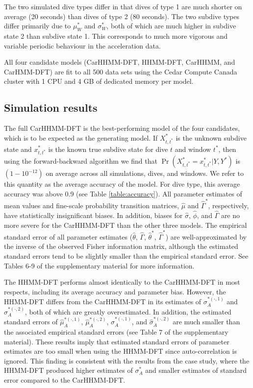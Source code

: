 The two simulated dive types differ in that dives of type 1 are much shorter on average (20 seconds) than dives of type 2 (80 seconds). The two subdive types differ primarily due to $\mu_W^*$ and $\sigma_W^*$, both of which are much higher in subdive state 2 than subdive state 1. This corresponds to much more vigorous and variable periodic behaviour in the acceleration data.

All four candidate models (CarHHMM-DFT, HHMM-DFT, CarHHMM, and CarHMM-DFT) are fit to all 500 data sets using the Cedar Compute Canada cluster with 1 CPU and 4 GB of dedicated memory per model.

\subsection{Simulation results}

The full CarHHMM-DFT is the best-performing model of the four candidates, which is to be expected as the generating model. If $X^*_{t,t^*}$ is the unknown subdive state and $x^*_{t,t^*}$ is the known true subdive state for dive $t$ and window $t^*$, then using the forward-backward algorithm we find that $\Pr(X^*_{t,t^*} = x^*_{t,t^*}|Y,Y^*)$ is $(1 - 10^{-12})$ on average across all simulations, dives, and windows. We refer to this quantity as the average accuracy of the model. For dive type, this average accuracy was above 0.9 (see Table \ref{table:accuracy}). All parameter estimates of mean values and fine-scale probability transition matrices, $\hat \mu$ and $\hat \Gamma^*$, respectively, have statistically insignificant biases. In addition, biases for $\hat \sigma$, $\hat \phi$, and $\hat \Gamma$ are no more severe for the CarHHMM-DFT than the other three models. The empirical standard error of all parameter estimates ($\hat \theta$, $\hat \Gamma$, $\hat \theta^*$, $\hat \Gamma^*$) are well-approximated by the inverse of the observed Fisher information matrix, although the estimated standard errors tend to be slightly smaller than the empirical standard error. See Tables 6-9 of the supplementary material for more information.

The HHMM-DFT performs almost identically to the CarHHMM-DFT in most respects, including its average accuracy and parameter bias. However, the HHMM-DFT differs from the CarHHMM-DFT in its estimates of $\sigma_A^{*(\cdot,1)}$ and $\sigma_A^{*(\cdot,2)}$, both of which are greatly overestimated. In addition, the estimated standard errors of $\hat \mu_A^{*(\cdot,1)}$, $\hat \mu_A^{*(\cdot,2)}$, $\hat \sigma_A^{*(\cdot,1)}$, and $\hat \sigma_A^{*(\cdot,2)}$ are much smaller than the associated empirical standard errors (see Table 7 of the supplementary material). These results imply that estimated standard errors of parameter estimates are too small when using the HHMM-DFT since auto-correlation is ignored. This finding is consistent with the results from the case study, where the HHMM-DFT produced higher estimates of $\sigma_A^*$ and smaller estimates of standard error compared to the CarHHMM-DFT.

